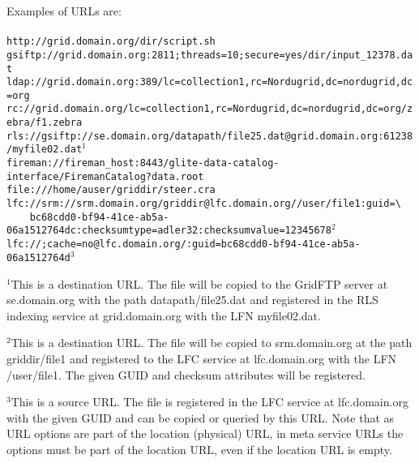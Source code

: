 \begin{framed}
   Examples of URLs are:\\
   \\
   \verb#http://grid.domain.org/dir/script.sh#\\
   \verb#gsiftp://grid.domain.org:2811;threads=10;secure=yes/dir/input_12378.dat#\\
   \verb#ldap://grid.domain.org:389/lc=collection1,rc=Nordugrid,dc=nordugrid,dc=org#\\
   \verb#rc://grid.domain.org/lc=collection1,rc=Nordugrid,dc=nordugrid,dc=org/zebra/f1.zebra#\\
   \verb#rls://gsiftp://se.domain.org/datapath/file25.dat@grid.domain.org:61238/myfile02.dat#$^1$\\
   \verb#fireman://fireman_host:8443/glite-data-catalog-interface/FiremanCatalog?data.root#\\
   \verb#file:///home/auser/griddir/steer.cra#\\
   \verb#lfc://srm://srm.domain.org/griddir@lfc.domain.org//user/file1:guid=\# \\
   \verb#    bc68cdd0-bf94-41ce-ab5a-06a1512764dc:checksumtype=adler32:checksumvalue=12345678#$^2$\\
   \verb#lfc://;cache=no@lfc.domain.org/:guid=bc68cdd0-bf94-41ce-ab5a-06a1512764d#$^3$\\
\end{framed}

$^1$This is a destination URL. The file will be copied to the GridFTP
server at se.domain.org with the path datapath/file25.dat and
registered in the RLS indexing service at grid.domain.org with the LFN
myfile02.dat.

$^2$This is a destination URL. The file will be copied to
srm.domain.org at the path griddir/file1 and registered to the LFC
service at lfc.domain.org with the LFN /user/file1. The given GUID
and checksum attributes will be registered.

$^3$This is a source URL. The file is registered in the LFC service at
lfc.domain.org with the given GUID and can be copied or queried by
this URL. Note that as URL options are part of the location (physical)
URL, in meta service URLs the options must be part of the location
URL, even if the location URL is empty.
